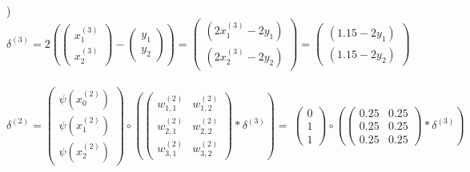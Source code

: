 \documentclass[12pt]{article}
\begin{document}
\noindent \indent \indent \indent \indent  \hrulefill \indent \indent \indent \indent  \\[.4em]


) $\delta^{(3)} = 2\left(
\begin{pmatrix}
x_1^{(3)} \\ x_2^{(3)}
\end{pmatrix} - 
\begin{pmatrix}
y_1 \\ y_2
\end{pmatrix}\right) = 
\begin{pmatrix}
(2x_1^{(3)} - 2y_1) \\ (2x_2^{(3)} - 2y_2)
\end{pmatrix} = 
\begin{pmatrix}
(1.15 - 2y_1) \\ (1.15 - 2y_2)
\end{pmatrix}$\\\\


\indent $\delta^{(2)} = 
\begin{pmatrix}
\psi(x^{(2)}_0) \\ \psi(x^{(2)}_1) \\ \psi(x^{(2)}_2)
\end{pmatrix} \circ \left(
\begin{pmatrix}
w_{1,1}^{(2)} & w_{1,2}^{(2)} \\
w_{2,1}^{(2)} & w_{2,2}^{(2)} \\
w_{3,1}^{(2)} & w_{3,2}^{(2)} 
\end{pmatrix}
* \delta^{(3)} \right) =
\
\begin{pmatrix}
0 \\ 1 \\ 1
\end{pmatrix} \circ \left(
\begin{pmatrix}
0.25 & 0.25 \\
0.25 & 0.25 \\
0.25 & 0.25 
\end{pmatrix}
* \delta^{(3)} \right)
$\\\\
\end{document}
